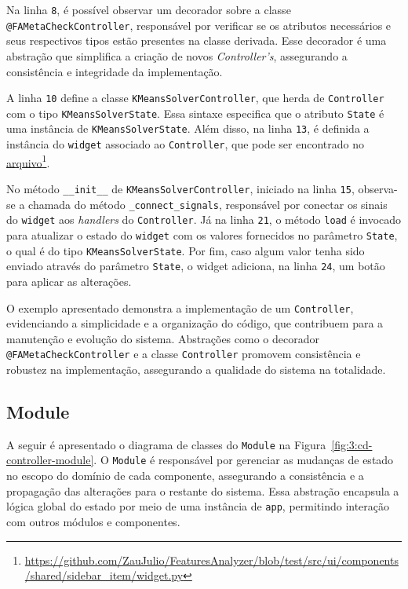 \hfill \break

Na linha \texttt{8}, é possível observar um decorador sobre a classe \texttt{@FAMetaCheckController}, responsável por verificar se os atributos necessários e seus respectivos tipos estão presentes na classe derivada. Esse decorador é uma abstração que simplifica a criação de novos \textit{Controller's}, assegurando a consistência e integridade da implementação.

\newcommand\urlSidebarItem{https://github.com/ZauJulio/FeaturesAnalyzer/blob/test/src/ui/components/shared/sidebar_item/widget.py}

A linha \texttt{10} define a classe \texttt{KMeansSolverController}, que herda de \texttt{Controller} com o tipo \texttt{KMeansSolverState}. Essa sintaxe especifica que o atributo \texttt{State} é uma instância de \texttt{KMeansSolverState}. Além disso, na linha \texttt{13}, é definida a instância do \texttt{widget} associado ao \texttt{Controller}, que pode ser encontrado no \href{\urlSidebarItem}{\underline{arquivo}}\footnote{\url{\urlSidebarItem}}.

No método \texttt{\_\_init\_\_} de \texttt{KMeansSolverController}, iniciado na linha \texttt{15}, observa-se a chamada do método \texttt{\_connect\_signals}, responsável por conectar os sinais do \texttt{widget} aos \textit{handlers} do \texttt{Controller}. Já na linha \texttt{21}, o método \texttt{load} é invocado para atualizar o estado do \texttt{widget} com os valores fornecidos no parâmetro \texttt{State}, o qual é do tipo \texttt{KMeansSolverState}. Por fim, caso algum valor tenha sido enviado através do parâmetro \texttt{State}, o widget adiciona, na linha \texttt{24}, um botão para aplicar as alterações.

O exemplo apresentado demonstra a implementação de um \texttt{Controller}, evidenciando a simplicidade e a organização do código, que contribuem para a manutenção e evolução do sistema. Abstrações como o decorador \texttt{@FAMetaCheckController} e a classe \texttt{Controller} promovem consistência e robustez na implementação, assegurando a qualidade do sistema na totalidade.

\subsection{Module}

A seguir é apresentado o diagrama de classes do \texttt{Module} na Figura~\ref{fig:3:cd-controller-module}. O \texttt{Module} é responsável por gerenciar as mudanças de estado no escopo do domínio de cada componente, assegurando a consistência e a propagação das alterações para o restante do sistema. Essa abstração encapsula a lógica global do estado por meio de uma instância de \texttt{app}, permitindo interação com outros módulos e componentes.

